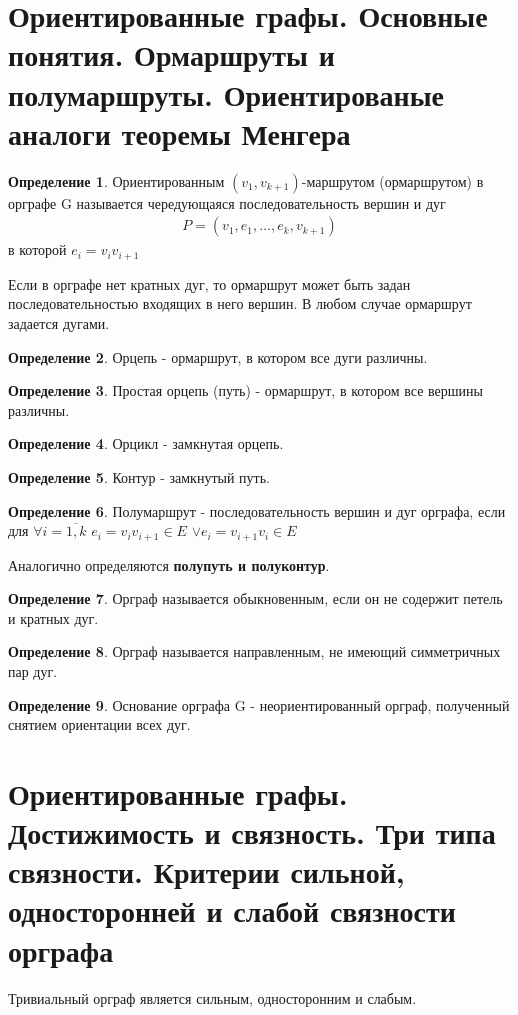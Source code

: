 \documentclass[a4paper]{article}
\theoremstyle{definition}
\newtheorem*{definition}{Определение}
\theoremstyle{remark}
\begin{document}
\begin{multicols*}{2}
    \section{Ориентированные графы. Основные понятия. Ормаршруты и полумаршруты. 
    Ориентированые аналоги теоремы Менгера}
    \begin{definition}
        Ориентированным $(v_1, v_{k+1})$-маршрутом (ормаршрутом) в орграфе G называется
        чередующаяся последовательность вершин и дуг
        \begin{align*}
            P = (v_1, e_1, \dots, e_k, v_{k+1})
        \end{align*}
        в которой $e_i = v_iv_{i+1}$
    \end{definition}
    Если в орграфе нет кратных дуг, то ормаршрут может быть задан последовательностью
    входящих в него вершин. В любом случае ормаршрут задается дугами.
    \begin{definition}
        Орцепь - ормаршрут, в котором все дуги различны.
    \end{definition}
    \begin{definition}
        Простая орцепь (путь) - ормаршрут, в котором все вершины различны.
    \end{definition}
    \begin{definition}
        Орцикл - замкнутая орцепь.
    \end{definition}
    \begin{definition}
        Контур - замкнутый путь.
    \end{definition}
    \begin{definition}
        Полумаршрут - последовательность вершин и дуг орграфа, если для $\forall i = \overline{1, k}$ $e_i = v_iv_{i+1}\in E$
        $\vee e_i = v_{i+1}v_i\in E$
    \end{definition}
    Аналогично определяются \textbf{полупуть и полуконтур}.
    \begin{definition}
        Орграф называется обыкновенным, если он не содержит петель и кратных дуг.
    \end{definition}
    \begin{definition}
        Орграф называется направленным, не имеющий симметричных пар дуг.
    \end{definition}
    \begin{definition}
        Основание орграфа G - неориентированный орграф, полученный снятием ориентации всех дуг.
    \end{definition}
    \section{Ориентированные графы. Достижимость и связность. Три типа связности. Критерии 
    сильной, односторонней и слабой связности орграфа}
    Тривиальный орграф является сильным, односторонним и слабым.


\end{multicols*}
\end{document}
